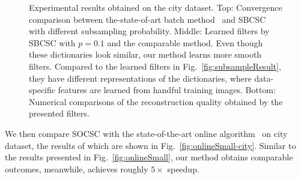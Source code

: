 \begin{figure}[h]

\caption{Experimental results obtained on the city dataset. Top: Convergence comparison between the-state-of-art batch method~\cite{heide2015fast} and SBCSC with different subsampling probability. Middle: Learned filters by SBCSC with $p=0.1$ and the comparable method. Even though these dictionaries look similar, our method learns more smooth filters. Compared to the learned filters in Fig.\ \ref{fig:subsampleResult}, they have different representations of the dictionaries, where data-specific features are learned from handful training images. Bottom: Numerical comparisons of the reconstruction quality obtained by the presented filters.}
\label{fig:subsampleResult-city}
\end{figure}

We then compare SOCSC with the state-of-the-art online algorithm~\cite{liu-2018-first} on city dataset, the results of which are shown in Fig.\ \ref{fig:onlineSmall-city}. Similar to the results presented in Fig.\ \ref{fig:onlineSmall}, our method obtains comparable outcomes, meanwhile, achieves roughly $5 \times$ speedup.

